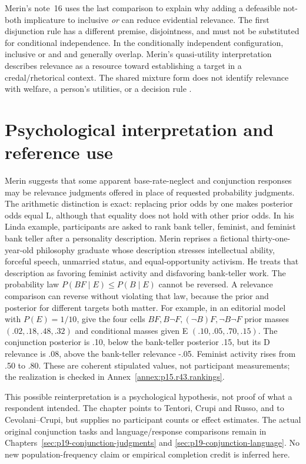 Merin's note~16 uses the last comparison to explain why adding a
defeasible not-both implicature to inclusive \emph{or} can reduce
evidential relevance. The first disjunction rule has a different
premise, disjointness, and must not be substituted for conditional
independence. In the conditionally independent configuration, inclusive
or and and generally overlap. Merin's quasi-utility interpretation
describes relevance as a resource toward establishing a target in a
credal/rhetorical context. The shared mixture form does not identify
relevance with welfare, a person's utilities, or a decision rule
\parencite[pp.~271--274 and p.~274, n.~16]{Merin2021Relevance}.

\section{Psychological interpretation and reference use}
\label{sec:p15-r43-use}

Merin suggests that some apparent base-rate-neglect and conjunction
responses may be relevance judgments offered in place of requested
probability judgments. The arithmetic distinction is exact: replacing
prior odds by one makes posterior odds equal L, although that equality
does not hold with other prior odds. In his Linda example, participants
are asked to rank bank teller, feminist, and feminist bank teller after
a personality description. Merin reprises a fictional thirty-one-year-old
philosophy graduate whose description stresses intellectual ability,
forceful speech, unmarried status, and equal-opportunity activism.
He treats that description as favoring feminist activity and disfavoring
bank-teller work. The probability law
\(P(BF\mid E)\leq P(B\mid E)\) cannot be reversed. A relevance
comparison can reverse without violating that law, because the prior
and posterior for different targets both matter. For example, in an
editorial model with \(P(E)=1/10\), give the four cells
\(BF,B\neg F,(\neg B)F,\neg B\neg F\) prior masses
\((.02,.18,.48,.32)\) and conditional masses given E
\((.10,.05,.70,.15)\). The conjunction posterior is .10, below the
bank-teller posterior .15, but its D relevance is .08, above the
bank-teller relevance -.05. Feminist activity rises from .50 to .80.
These are coherent stipulated values, not participant measurements;
the realization is checked in Annex~\ref{annex:p15.r43.rankings}.

This possible reinterpretation is a psychological hypothesis, not
proof of what a respondent intended. The chapter points to Tentori,
Crupi and Russo, and to Cevolani--Crupi, but supplies no participant
counts or effect estimates. The actual original conjunction tasks and
language/response comparisons remain in
Chapters~\ref{sec:p19-conjunction-judgments} and
\ref{sec:p19-conjunction-language}. No new population-frequency claim
or empirical completion credit is inferred here.

